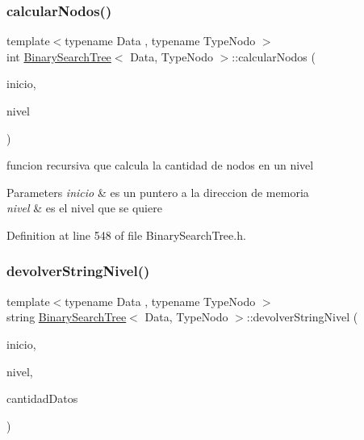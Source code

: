 \subsubsection{\texorpdfstring{calcular\+Nodos()}{calcularNodos()}\hspace{0.1cm}{\footnotesize\ttfamily [2/2]}}
{\footnotesize\ttfamily template$<$typename Data , typename Type\+Nodo $>$ \\
int \hyperlink{class_binary_search_tree}{Binary\+Search\+Tree}$<$ Data, Type\+Nodo $>$\+::calcular\+Nodos (\begin{DoxyParamCaption}\item[{\hyperlink{class_class_node}{Class\+Node}$<$ Data $>$ $\ast$}]{inicio,  }\item[{int}]{nivel }\end{DoxyParamCaption})\hspace{0.3cm}{\ttfamily [inline]}}



funcion recursiva que calcula la cantidad de nodos en un nivel 


\begin{DoxyParams}{Parameters}
{\em inicio} & es un puntero a la direccion de memoria \\
\hline
{\em nivel} & es el nivel que se quiere \\
\hline
\end{DoxyParams}


Definition at line 548 of file Binary\+Search\+Tree.\+h.

\mbox{\label{class_binary_search_tree_a30a79ed298da4d6fe4395dddd53842b8}} 
\subsubsection{\texorpdfstring{devolver\+String\+Nivel()}{devolverStringNivel()}\hspace{0.1cm}{\footnotesize\ttfamily [1/2]}}
{\footnotesize\ttfamily template$<$typename Data , typename Type\+Nodo $>$ \\
string \hyperlink{class_binary_search_tree}{Binary\+Search\+Tree}$<$ Data, Type\+Nodo $>$\+::devolver\+String\+Nivel (\begin{DoxyParamCaption}\item[{\hyperlink{class_class_node}{Class\+Node}$<$ Data $>$ $\ast$}]{inicio,  }\item[{int}]{nivel,  }\item[{int}]{cantidad\+Datos }\end{DoxyParamCaption})\hspace{0.3cm}{\ttfamily [inline]}}



